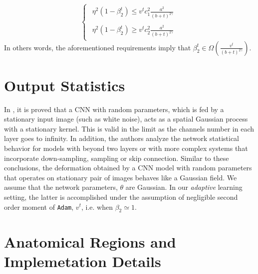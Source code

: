 \documentclass[preprint,authoryear]{elsarticle}
\begin{document}
\begin{equation}
\begin{cases}
\begin{array}{c}
\eta^2 (1-\beta_2^t) \leq v^t c_1^2 \frac{a^2}{(b+t)^{2\gamma}}   \\
\\
\eta^2 (1-\beta_2^t) \geq v^t c_2^2 \frac{a^2}{(b+t)^{2\gamma}}
\end{array}\end{cases}
\label{eq:2}
\end{equation}
In others words, the aforementioned requirements imply that $\beta_{2}^t\in \Omega\left(\frac{v^t}{(b+t)^{2\gamma}}\right)$.

\section{Output Statistics}\label{app:2}
In \cite{cheng2019bayesian}, it is proved that a CNN with random parameters, which is fed by a stationary input image (such as white noise), acts as a spatial Gaussian process with a stationary kernel. This is valid in the limit as the channels number in each layer goes to infinity. In addition, the authors analyze the network statistical behavior for models with beyond two layers or with more complex systems that incorporate down-sampling, sampling or skip connection. Similar to these conclusions, the deformation obtained by a CNN model with random parameters that operates on stationary pair of images behaves like a Gaussian field. We assume that the network parameters, $\theta$ are Gaussian. In our \textit{adaptive} learning setting, the latter is accomplished under the assumption of negligible second order moment of \texttt{Adam}, $v^t$, i.e. when $\beta_{2}\simeq1$.
\section{Anatomical Regions and Implemetation Details} \label{appendix:details}
\end{document}
